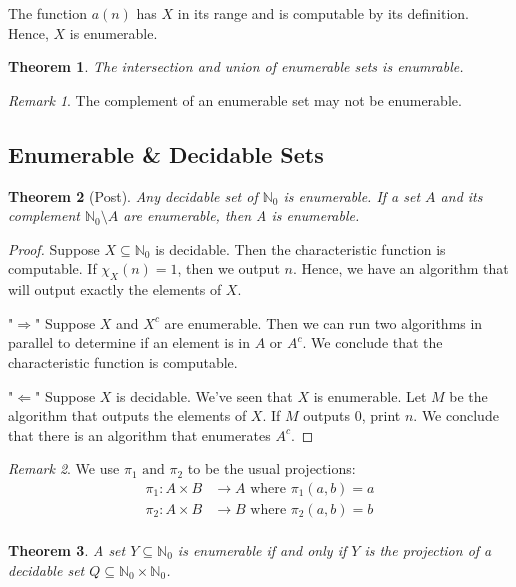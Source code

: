 \documentclass[10pt, letterpaper]{article}
\newcommand{\N}{\mathbb{N}}
\newtheorem{thm}{Theorem}
\theoremstyle{remark}
\newtheorem{rem}{Remark}
\theoremstyle{definition}
\begin{document}
\noindent The function $a(n)$ has $X$ in its range and is computable by its definition. Hence, $X$ is enumerable.

\begin{thm}
	The intersection and union of enumerable sets is enumrable.
\end{thm}

\begin{rem}
	The complement of an enumerable set may not be enumerable.
\end{rem}

\subsection*{Enumerable \& Decidable Sets}

\begin{thm}[Post]
	Any decidable set of $\N_0$ is enumerable. If a set $A$ and its complement $\N_0 \setminus A$ are enumerable, then A is enumerable.
\end{thm}

\begin{proof}
	Suppose $X \subseteq \N_0$ is decidable. Then the characteristic function is computable. If $\chi_X(n)=1$, then we output $n$.
	Hence, we have an algorithm that will output exactly the elements of $X$.

	"$\Rightarrow$" Suppose $X$ and $X^c$ are enumerable. Then we can run two algorithms in parallel to determine if an element is in $A$ or $A^c$.
	We conclude that the characteristic function is computable.

	"$\Leftarrow$" Suppose $X$ is decidable. We've seen that $X$ is enumerable. Let $M$ be the algorithm that outputs the 
	elements of $X$. If $M$ outputs 0, print $n$. We conclude that there is an algorithm that enumerates $A^c$.
\end{proof}

\begin{rem}
	We use $\pi_1 \text{ and } \pi_2$ to be the usual projections:
	\begin{align*}
		\pi_1: A \times B & \rightarrow A \text{ where } \pi_1(a,b) = a \\
		\pi_2: A \times B & \rightarrow B \text { where } \pi_2(a,b) = b \\
	\end{align*}
\end{rem}

\begin{thm}
	A set $Y \subseteq \N_0$ is enumerable if and only if $Y$ is the projection of a decidable set $Q \subseteq \N_0 \times \N_0$.
\end{thm}
\end{document}
